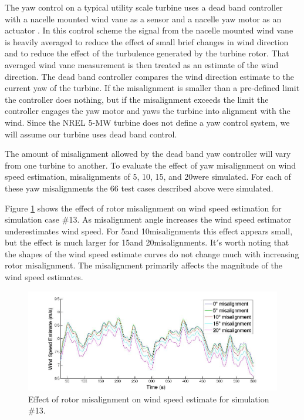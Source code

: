 The yaw control on a typical utility scale turbine uses a dead band controller with a nacelle mounted wind vane as a sensor and a nacelle yaw motor as an actuator \cite{burton2011}. In this control scheme the signal from the nacelle mounted wind vane is heavily averaged to reduce the effect of small brief changes in wind direction and to reduce the effect of the turbulence generated by the turbine rotor. That averaged wind vane measurement is then treated as an estimate of the wind direction. The dead band controller compares the wind direction estimate to the current yaw of the turbine. If the misalignment is smaller than a pre-defined limit the controller does nothing, but if the misalignment exceeds the limit the controller engages the yaw motor and yaws the turbine into alignment with the wind. Since the NREL 5-MW turbine does not define a yaw control system, we will assume our turbine uses dead band control.

The amount of misalignment allowed by the dead band yaw controller will vary from one turbine to another. To evaluate the effect of yaw misalignment on wind speed estimation, misalignments of 5\degree, 10\degree, 15\degree, and 20\degree were simulated. For each of these yaw misalignments the 66 test cases described above were simulated.

Figure \ref{fig2-20} shows the effect of rotor misalignment on wind speed estimation for simulation case \#13. As misalignment angle increases the wind speed estimator underestimates wind speed. For 5\degree and 10\degree misalignments this effect appears small, but the effect is much larger for 15\degree and 20\degree misalignments. It$'$s worth noting that the shapes of the wind speed estimate curves do not change much with increasing rotor misalignment. The misalignment primarily affects the magnitude of the wind speed estimates. 


\begin{figure}[ht]
	\centering
		\includegraphics[width = \linewidth]{Figures/ch2Figures/fig2-20.jpg}
		
	\caption{Effect of rotor misalignment on wind speed estimate for simulation \#13.}
	\label{fig2-20}
\end{figure}

